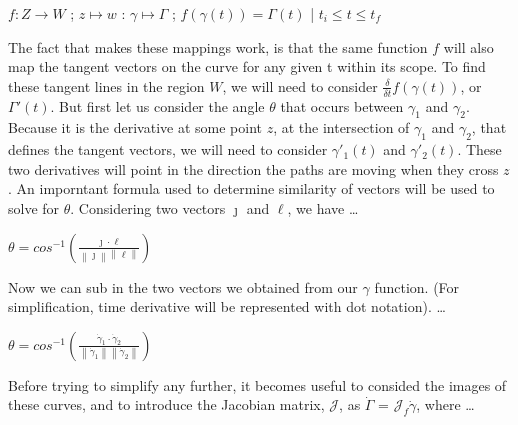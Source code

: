 \documentclass[a4paper,man,natbib]{apa6}
\begin{document}
\begin{center}

      $ f : Z \to W $ ; $ z \mapsto w $ : $ \gamma \mapsto \Gamma $ ; $ f(\gamma(t)) = \Gamma(t) $ | $ t_{i} \leq t \leq t_{f} $

\end{center}

The fact that makes these mappings work, is that the same function $ f $ will also map the tangent vectors on the curve for any given t within its scope.
To find these tangent lines in the region $ W $, we will need to consider $ \frac{\delta}{\delta t}f(\gamma(t)) $, or $ \Gamma'(t) $.
But first let us consider the angle $ \theta $ that occurs between $ \gamma_1 $ and $ \gamma_2 $.
Because it is the derivative at some point $ z $, at the intersection of $ \gamma_1 $ and $ \gamma_2 $, that
defines the tangent vectors, we will need to consider $ \gamma'_1(t) $ and $ \gamma'_2(t) $. These two derivatives will
point in the direction the paths are moving when they cross $ z $.
An imporntant formula used to determine similarity of vectors will be used to solve for $ \theta $.
Considering two vectors $ \jmath $ and $ \ell $, we have \dots

\begin{center}

      $ \theta = cos^{-1}(\frac{\jmath  \cdot \ell }{\left\lVert \jmath \right\rVert \left\lVert \ell  \right\rVert })$

\end{center}

Now we can sub in the two vectors we obtained from our $ \gamma $ function. (For simplification, time derivative will be represented with dot notation). \dots

\begin{center}

      $ \theta = cos^{-1}(\frac{\dot{\gamma}_1  \cdot \dot{\gamma}_2 }{\left\lVert \dot{\gamma}_1 \right\rVert \left\lVert \dot{\gamma}_2  \right\rVert })$

\end{center}

Before trying to simplify any further, it becomes useful to consided the images of these curves, and to introduce the Jacobian matrix, $ \mathcal{J} $, as $ \dot{\Gamma} $ = $ \mathcal{J}_f\dot{\gamma}$, where \dots
\end{document}
